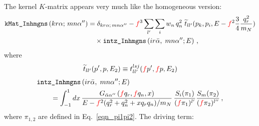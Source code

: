 \documentclass[11pt,aps]{revtex4}
\newcommand{\PF}{{\color{red}f}}
\begin{document}
The kernel $K$-matrix appears very much like the homogeneous version:
\begin{equation}
  \begin{split}
    \texttt{kMat\_Inhmgns}\left(kr\alpha;\, mn\alpha''\right) &= \delta_{kr\alpha;\, mn\alpha''} - \PF^3 \sum_{l'} \sum_{i} w_n\, q_n^2\; \widetilde{t}_{ll'}(p_k, p_i, E - \PF^2 \frac{3}{4} \frac{q_r^2}{m_N}) \\
  & \quad  \times
  \texttt{intz\_Inhmgns}\left(i r \bar{\alpha},\; m n \alpha''; E\right) \, ,
  \end{split} \label{eqn-kMat-inhomo}
\end{equation}
where
\begin{equation}
  \begin{split}
    \widetilde{t}_{ll'}(p', p, E_2) \equiv t^{lsj}_{ll'}(\PF p', \PF p, E_2)
  \end{split}
\end{equation}
\begin{equation}
\begin{split}
  & \texttt{intz\_Inhmgns}\left(i r \bar{\alpha},\; m n \alpha''; E\right) \\
  & \qquad = \int_{-1}^1{dx}\, \frac{G_{\bar{\alpha}\alpha''}\left(\PF q_r, \PF q_n, x\right)}{E - \PF^2 (q_r^2 + {q}_n^2 + x q_r q_n)/m_N}\, \frac{S_i(\pi_1)}{(\PF \pi_1)^{l'}}
  \frac{S_m(\pi_2)}{(\PF \pi_2)^{l''}} \, ,
\end{split}
\end{equation}
where $\pi_{1, 2}$ are defined in Eq.~\eqref{eqn_pi1pi2}.
The driving term:
\end{document}
